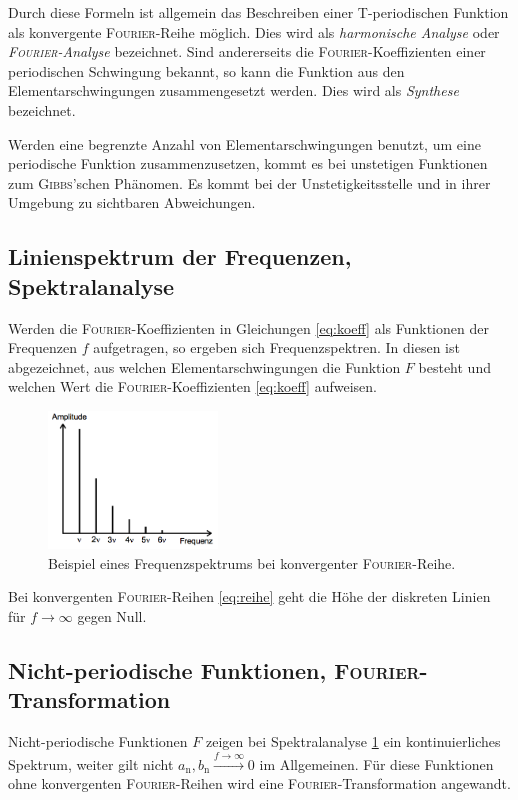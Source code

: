 Durch diese Formeln ist allgemein das Beschreiben einer T-periodischen Funktion als konvergente \textsc{Fourier}-Reihe möglich.
Dies wird als \textit{harmonische Analyse} oder \textit{\textsc{Fourier}-Analyse} bezeichnet.
Sind andererseits die \textsc{Fourier}-Koeffizienten einer periodischen Schwingung bekannt, so kann die Funktion aus den Elementarschwingungen zusammengesetzt werden.
Dies wird als \textit{Synthese} bezeichnet.

Werden eine begrenzte Anzahl von Elementarschwingungen benutzt, um eine periodische Funktion zusammenzusetzen, kommt es bei unstetigen Funktionen zum \textsc{Gibbs}'schen Phänomen.
Es kommt bei der Unstetigkeitsstelle und in ihrer Umgebung zu sichtbaren Abweichungen.

\subsection{Linienspektrum der Frequenzen, Spektralanalyse}
\label{sec:theorie2}
Werden die \textsc{Fourier}-Koeffizienten in Gleichungen \eqref{eq:koeff} als Funktionen der Frequenzen $f$ aufgetragen, so ergeben sich Frequenzspektren. 
In diesen ist abgezeichnet, aus welchen Elementarschwingungen die Funktion $F$ besteht und welchen Wert die \textsc{Fourier}-Koeffizienten \eqref{eq:koeff} aufweisen.
\begin{figure}
	\centering
	\includegraphics[width=0.4\textwidth]{Bilder/Linienspektrum.png}
	\caption{Beispiel eines Frequenzspektrums bei konvergenter \textsc{Fourier}-Reihe. \cite{V351}}
	\label{fig:analyse}
\end{figure}
Bei konvergenten \textsc{Fourier}-Reihen \eqref{eq:reihe} geht die Höhe der diskreten Linien für $f\xrightarrow{}\infty$ gegen Null.

\subsection{Nicht-periodische Funktionen, \textsc{Fourier}-Transformation}
\label{sec:theorie3}
Nicht-periodische Funktionen $F$ zeigen bei Spektralanalyse \ref{fig:analyse} ein kontinuierliches Spektrum, weiter gilt nicht $a_\text{n},b_\text{n}\xrightarrow{f\to\infty}0$ im Allgemeinen.
Für diese Funktionen ohne konvergenten \textsc{Fourier}-Reihen wird eine \textsc{Fourier}-Transformation angewandt.

